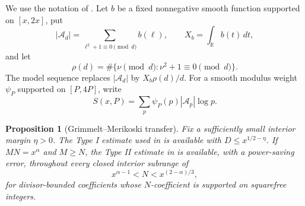 \documentclass[10pt,reqno]{amsart}
\newcommand{\Acal}{\mathcal{A}}
\newcommand{\1}{\mathbf{1}}
\theoremstyle{plain}
\newtheorem{proposition}[theorem]{Proposition}
\theoremstyle{remark}
\begin{document}
We use the notation of \cite[Section 2]{Merikoski2020}.  Let $b$ be a fixed
nonnegative smooth function supported on $[x,2x]$, put
\[
  |\Acal_d|=\sum_{\ell^2+1\equiv0\pmod d}b(\ell),
  \qquad X_b=\int_{\mathbb R}b(t)\,dt,
\]
and let
\[
  \rho(d)=\#\{\nu\pmod d:\nu^2+1\equiv0\pmod d\}.
\]
The model sequence replaces $|\Acal_d|$ by $X_b\rho(d)/d$.  For a smooth
modulus weight $\psi_P$ supported on $[P,4P]$, write
\[
  S(x,P)=\sum_p\psi_P(p)|\Acal_p|\log p.
\]

\begin{proposition}[Grimmelt--Merikoski transfer]\label{prop:transfer}
Fix a sufficiently small interior margin $\eta>0$.  The Type I estimate used
in \cite[Proposition 3]{Merikoski2020} is available with
$D\le x^{1/2-\eta}$.  If $MN=x^\alpha$ and $M\ge N$, the Type II estimate in
\cite[Proposition 4(i)]{Merikoski2020} is available, with a power-saving
error, throughout every closed interior subrange of
\begin{equation}\label{eq:typeII}
  x^{\alpha-1}<N<x^{(2-\alpha)/3},
\end{equation}
for divisor-bounded coefficients whose $N$-coefficient is supported on
squarefree integers.
\end{proposition}
\end{document}
